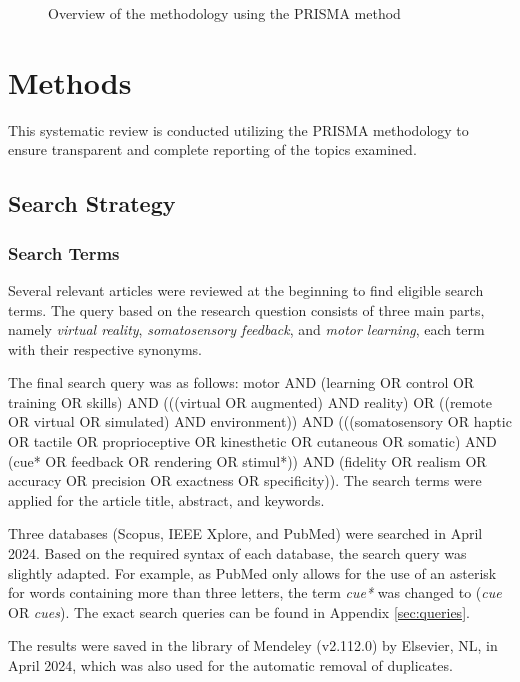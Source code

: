 
\begin{figure*}[htbp]
    \centering
     
    \caption{Overview of the methodology using the PRISMA method}
    \label{fig:prisma}
\end{figure*}

\section{Methods}
\label{sec:methods}
This systematic review is conducted utilizing the PRISMA methodology \cite{Page2021TheReviews} to ensure transparent and complete reporting of the topics examined.

\subsection{Search Strategy}

\subsubsection{Search Terms}
Several relevant articles were reviewed at the beginning to find eligible search terms. The query based on the research question consists of three main parts, namely \textit{virtual reality}, \textit{somatosensory feedback}, and \textit{motor learning}, each term with their respective synonyms. 

The final search query was as follows: motor AND (learning OR control OR training OR skills) AND (((virtual OR augmented) AND reality) OR ((remote OR virtual OR simulated) AND environment)) AND (((somatosensory OR haptic OR tactile OR proprioceptive OR kinesthetic OR cutaneous OR somatic) AND 
(cue* OR feedback OR rendering OR stimul*)) AND (fidelity OR realism OR accuracy OR precision OR exactness OR specificity)). The search terms were applied for the article title, abstract, and keywords.

Three databases (Scopus, IEEE Xplore, and PubMed) were searched in April 2024. Based on the required syntax of each database, the search query was slightly adapted. For example, as PubMed only allows for the use of an asterisk for words containing more than three letters, the term \textit{cue*} was changed to (\textit{cue} OR \textit{cues}). The exact search queries can be found in Appendix \ref{sec:queries}. 

The results were saved in the library of Mendeley (v2.112.0) by Elsevier, NL, in April 2024, which was also used for the automatic removal of duplicates. 

